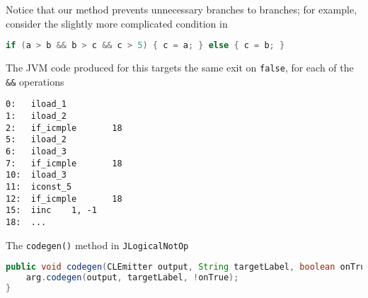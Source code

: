 \documentclass[8pt,a4paper,compress]{beamer}
\begin{document}
\begin{frame}[fragile]
\pause

Notice that our method prevents unnecessary branches to branches; for example, consider the slightly more complicated condition in

\smallskip

\begin{lstlisting}[language=Java,style=focusin]
if (a > b && b > c && c > 5) { c = a; } else { c = b; }

\end{lstlisting}

The JVM code produced for this targets the same exit on \lstinline{false}, for each of the \lstinline{&&} operations

\smallskip

\begin{lstlisting}[language={},style=focusin]
0:   iload_1
1:   iload_2
2:   if_icmple       18
5:   iload_2
6:   iload_3
7:   if_icmple       18
10:  iload_3
11:  iconst_5
12:  if_icmple       18
15:  iinc    1, -1
18:  ...
\end{lstlisting}

\pause
\bigskip

The \lstinline{codegen()} method in \lstinline{JLogicalNotOp}

\smallskip

\begin{lstlisting}[language=Java,style=focusin]
public void codegen(CLEmitter output, String targetLabel, boolean onTrue) {
    arg.codegen(output, targetLabel, !onTrue);
}
\end{lstlisting}
\end{frame}
\end{document}
